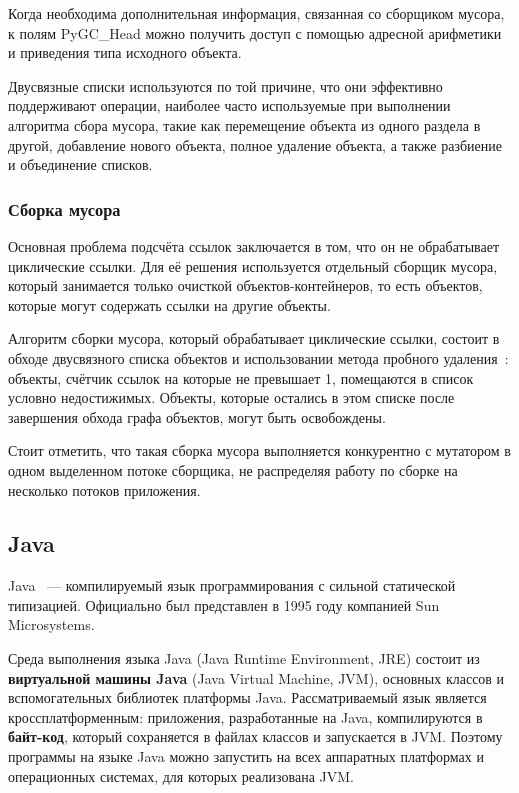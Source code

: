 Когда необходима дополнительная информация, связанная со сборщиком мусора, к полям PyGC\_Head можно получить доступ с помощью адресной арифметики и приведения типа исходного объекта.~\cite{python_gc}

Двусвязные списки используются по той причине, что они эффективно поддерживают операции, наиболее часто используемые при выполнении алгоритма сбора мусора, такие как перемещение объекта из одного раздела в другой, добавление нового объекта, полное удаление объекта, а также разбиение и объединение списков.~\cite{python_gc}

\subsubsection*{Сборка мусора}

Основная проблема подсчёта ссылок заключается в том, что он не обрабатывает циклические ссылки. Для её решения используется отдельный сборщик мусора, который занимается только очисткой объектов-контейнеров, то есть объектов, которые могут содержать ссылки на другие объекты.~\cite{python_gc}

Алгоритм сборки мусора, который обрабатывает циклические ссылки, состоит в обходе двусвязного списка объектов и использовании метода пробного удаления~\cite{handbook}: объекты, счётчик ссылок на которые не превышает 1, помещаются в список условно недостижимых. Объекты, которые остались в этом списке после завершения обхода графа объектов, могут быть освобождены.~\cite{python_gc}

Стоит отметить, что такая сборка мусора выполняется конкурентно с мутатором в одном выделенном потоке сборщика, не распределяя работу по сборке на несколько потоков приложения.~\cite{python_threaded_gc}


\subsection*{Java}

Java~\cite{java_gc_basics} --- компилируемый язык программирования с сильной статической типизацией. Официально был представлен в 1995 году компанией Sun Microsystems. 

Среда выполнения языка Java (Java Runtime Environment, JRE) состоит из \textbf{виртуальной машины Java} (Java Virtual Machine, JVM), основных классов и вспомогательных библиотек платформы Java. Рассматриваемый язык является кроссплатформенным: приложения, разработанные на Java, компилируются в \textbf{байт-код}, который сохраняется в файлах классов и запускается в JVM. Поэтому программы на языке Java можно запустить на всех аппаратных платформах и операционных системах, для которых реализована JVM.~\cite{java_gc_basics}

